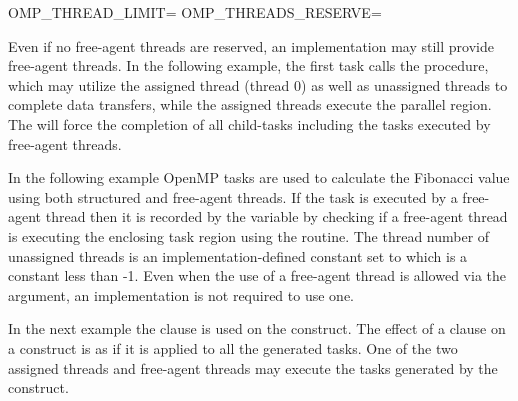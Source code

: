 \begin{boxedcode}
OMP_THREAD_LIMIT=
OMP_THREADS_RESERVE=
\end{boxedcode}

Even if no free-agent threads are reserved, an implementation may still provide free-agent threads. 
In the following example, the first task calls the  procedure, which may
utilize the assigned thread (thread 0) as well as unassigned threads to complete data transfers, 
while the assigned threads execute the parallel region. The  will force the completion 
of all child-tasks including the tasks executed by free-agent threads.


In the following example OpenMP tasks are used to calculate the Fibonacci value using both structured 
and free-agent threads. If the task is executed by a free-agent thread then it is recorded by the 
 variable by checking if a free-agent thread is executing the enclosing task region using 
the  routine. The thread number of unassigned threads is an implementation-defined 
constant set to  which is a constant less than -1. Even when the use of 
a free-agent thread is allowed via the  argument, an implementation is not required to use one. 



In the next example the  clause is used on the  construct. The effect of 
a  clause on a  construct is as if it is applied to all the generated tasks. 
One of the two assigned threads and free-agent threads may execute the tasks generated by the  construct. 



